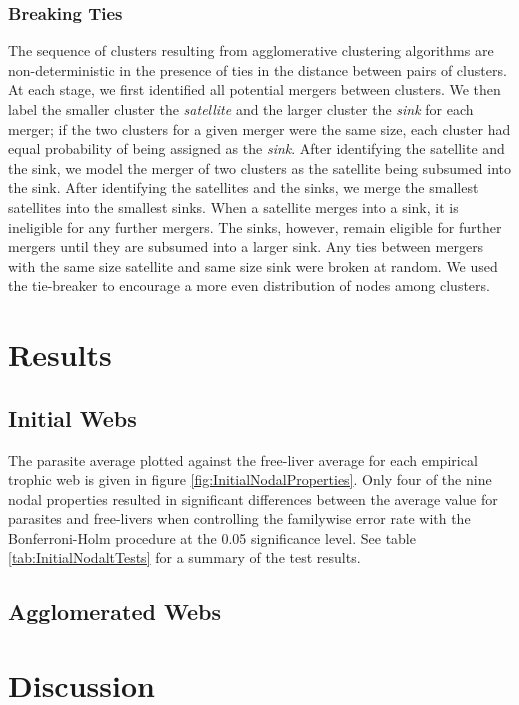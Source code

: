 \documentclass{article}
\begin{document}
\subsubsection{Breaking Ties} The sequence of clusters resulting from
agglomerative clustering algorithms are non-deterministic in the presence of
ties in the distance between pairs of clusters. At each stage, we first
identified all potential mergers between clusters. We then label the smaller
cluster the \textit{satellite} and the larger cluster the \textit{sink} for
each merger; if the two clusters for a given merger were the same size, each
cluster had equal probability of being assigned as the \textit{sink}. After
identifying the satellite and the sink, we model the merger of two clusters as
the satellite being subsumed into the sink. After identifying the satellites
and the sinks, we merge the smallest satellites into the smallest sinks. When a
satellite merges into a sink, it is ineligible for any further mergers. The
sinks, however, remain eligible for further mergers until they are subsumed
into a larger sink. Any ties between mergers with the same size satellite and
same size sink were broken at random. We used the tie-breaker to encourage a
more even distribution of nodes among clusters.  

\section{Results} 

\subsection{Initial Webs} 
The parasite average plotted against the free-liver average for each empirical
trophic web is given in figure \ref{fig:InitialNodalProperties}. Only four
of the nine nodal properties resulted in significant differences between the
average value for parasites and free-livers when controlling the familywise
error rate with the Bonferroni-Holm procedure at the 0.05 significance level.
See table \ref{tab:InitialNodaltTests} for a summary of the test results.


\subsection{Agglomerated Webs}

    
\section{Discussion} 
\end{document}
